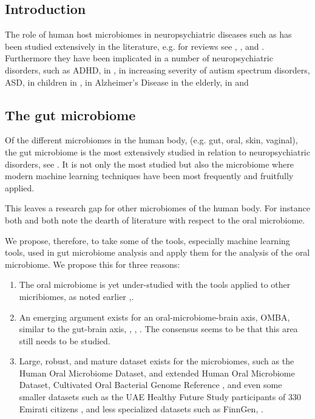 \documentclass{article}
\begin{document}
\noindent
\begin{multicols}{2}
\section{Introduction}
The role of human host microbiomes in neuropsychiatric diseases such as has been studied extensively in the literature, e.g. for reviews see \cite{goswami_role_2021}, \cite{hashimoto_emerging_2023}, and \cite{bonnechere}. Furthermore they have been implicated in a number of neuropsychiatric disorders, such as ADHD, in \cite{bull-larsen_potential_2019}, in increasing severity of autism spectrum disorders, ASD, in children in \cite{TOMOVA2015179}, in Alzheimer's Disease in the elderly, in \cite{yk_microbiota-gut-brain_2018} and \cite{escobar_influence_2022}
\subsection{The gut microbiome}
Of the different microbiomes in the human body, (e.g. gut, oral, skin, vaginal), the gut microbiome is the most extensively studied in relation to neuropsychiatric disorders, see \cite{sorboni_comprehensive_2022}. It is not only the most studied but also the microbiome where modern machine learning techniques have been most frequently and fruitfully applied. 

This leaves a research gap for other microbiomes of the human body. For instance both \cite{goswami_role_2021} and \cite{tao_relationship_2024} both note the dearth of literature with respect to the oral microbiome. 

We propose, therefore, to take some of the tools, especially machine learning tools, used in gut microbiome analysis and apply them for the analysis of the oral microbiome. We propose this for three reasons:

\begin{enumerate}
	\item The oral microbiome is yet under-studied with the tools applied to other micribiomes, as noted earlier \cite{goswami_role_2021},\cite{tao_relationship_2024}.
	\item An emerging argument exists for an oral-microbiome-brain axis, OMBA, similar to the gut-brain axis, \cite{bowland_oral-microbiome-brain_2022}, \cite{xi_coming_2024}, \cite{y_did_2020}. The consensus seems to be that this area still needs to be studied.
	\item Large, robust, and mature dataset exists for the microbiomes, such as the Human Oral Microbiome Dataset, and extended Human Oral Microbiome Dataset\cite{homd}, Cultivated Oral Bacterial Genome Reference \cite{li_catalog_2023}, and even some smaller datasets such as the UAE Healthy Future Study participants of 330 Emirati citizens \cite{noauthor_human_nodate}, and less specialized datasets such as FinnGen, \cite{noauthor_finngen_nodate}.
\end{enumerate}

\end{multicols}
\end{document}
